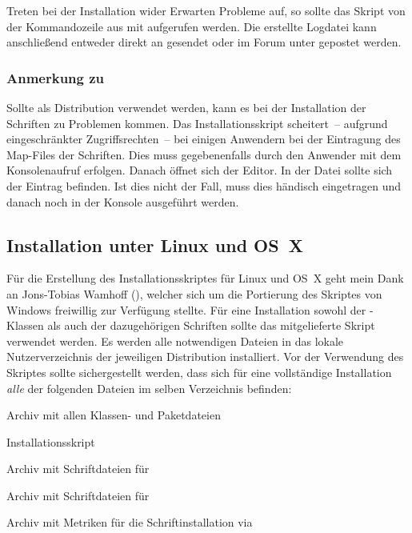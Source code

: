 \documentclass[%
  english,ngerman,%
  headings=optiontoheadandtoc,captions=tableheading,numbers=noenddot,%
  chapterpage,cdfoot,%
]{tudscrman}
\newlength{\tempdim}
\begin{document}
Treten bei der Installation wider Erwarten Probleme auf, so sollte das Skript 
von der Kommandozeile aus mit 
aufgerufen werden. Die erstellte Logdatei kann anschließend entweder direkt an 
\Email{\filemail} gesendet oder im Forum unter \forum gepostet werden.

\subsubsection*{Anmerkung zu }
Sollte als Distribution  verwendet werden, kann es 
bei der Installation der Schriften zu Problemen kommen. Das Installationsskript 
scheitert~-- aufgrund eingeschränkter Zugriffsrechten~-- bei einigen Anwendern 
bei der Eintragung des Map-Files der Schriften. Dies muss gegebenenfalls durch 
den Anwender mit dem Konsolenaufruf  
erfolgen. Danach öffnet sich der Editor. In der Datei sollte sich der Eintrag 
 befinden. Ist dies nicht der Fall, muss dies händisch 
eingetragen und danach noch  in der Konsole ausgeführt 
werden.

\subsection{Installation unter Linux und OS~X}
Für die Erstellung des Installationsskriptes für Linux und OS~X geht mein Dank 
an Jons-Tobias Wamhoff (), welcher sich um die 
Portierung des Skriptes von Windows freiwillig zur Verfügung stellte.  Für eine 
Installation sowohl der \TUDScript-Klassen als auch der dazugehörigen Schriften 
sollte das mitgelieferte Skript  verwendet 
werden. Es werden alle notwendigen Dateien in das lokale Nutzerverzeichnis der 
jeweiligen Distribution installiert. Vor der Verwendung des Skriptes sollte 
sichergestellt werden, dass sich für eine vollständige Installation \emph{alle} 
der folgenden Dateien im selben Verzeichnis befinden:
%
%
\begin{description}[labelwidth=\tempdim,labelsep=1em]
  \item[\File{tudscr\_\vTUDScript.zip}]Archiv mit allen Klassen- und Paketdateien
  \item[\File{tudscr\_\vTUDScript\_install.sh}]Installationsskript
  \item[\File{Univers\_PS.zip}]Archiv mit Schriftdateien für \Univers
  \item[\File{DIN\_Bd\_PS.zip}]Archiv mit Schriftdateien für \DIN
  \item[\File{tudscrfont.zip}]Archiv mit Metriken für die Schriftinstallation   
    via 
\end{description}
\end{document}
